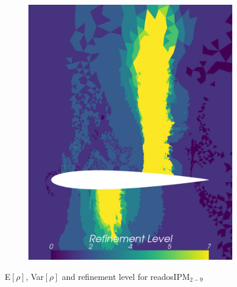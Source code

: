 \begin{figure}[h!]
\begin{subfigure}{0.3\linewidth}
		\includegraphics[scale=0.2]{figs/Euler1DPlots10/euler2D_nacaCoarse_refadosipm_n2-9_sg2-4_s05_aoa_oneRet_refinementLevel.png}
		\label{fig:sub1}
	\end{subfigure}
	\caption{E$[\rho]$, Var$[\rho]$ and refinement level for readosIPM$_{2-9}$}
	\label{fig:readosIPMEVar}
\end{figure}


